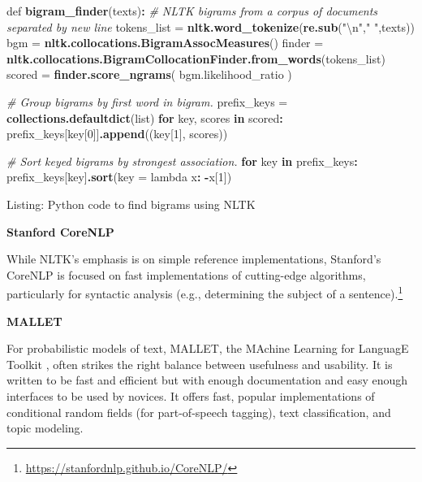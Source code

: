 \documentclass[]{krantz}
\newenvironment{Shaded}{\begin{snugshade}}{\end{snugshade}}
\newcommand{\KeywordTok}[1]{\textcolor[rgb]{0.13,0.29,0.53}{\textbf{#1}}}
\newcommand{\DataTypeTok}[1]{\textcolor[rgb]{0.13,0.29,0.53}{#1}}
\newcommand{\DecValTok}[1]{\textcolor[rgb]{0.00,0.00,0.81}{#1}}
\newcommand{\CharTok}[1]{\textcolor[rgb]{0.31,0.60,0.02}{#1}}
\newcommand{\StringTok}[1]{\textcolor[rgb]{0.31,0.60,0.02}{#1}}
\newcommand{\CommentTok}[1]{\textcolor[rgb]{0.56,0.35,0.01}{\textit{#1}}}
\newcommand{\ControlFlowTok}[1]{\textcolor[rgb]{0.13,0.29,0.53}{\textbf{#1}}}
\newcommand{\OperatorTok}[1]{\textcolor[rgb]{0.81,0.36,0.00}{\textbf{#1}}}
\newcommand{\NormalTok}[1]{#1}
\begin{document}
\begin{Shaded}
\begin{Highlighting}[]
\NormalTok{def }\KeywordTok{bigram_finder}\NormalTok{(texts)}\OperatorTok{:}
\StringTok{  }\CommentTok{# NLTK bigrams from a corpus of documents separated by new line}
\StringTok{  }\NormalTok{tokens_list =}\StringTok{ }\KeywordTok{nltk.word_tokenize}\NormalTok{(}\KeywordTok{re.sub}\NormalTok{(}\StringTok{"}\CharTok{\textbackslash{}n}\StringTok{"}\NormalTok{,}\StringTok{" "}\NormalTok{,texts))}
\NormalTok{  bgm    =}\StringTok{ }\KeywordTok{nltk.collocations.BigramAssocMeasures}\NormalTok{()}
\NormalTok{  finder =}\StringTok{ }\KeywordTok{nltk.collocations.BigramCollocationFinder.from_words}\NormalTok{(tokens_list)}
\NormalTok{  scored =}\StringTok{ }\KeywordTok{finder.score_ngrams}\NormalTok{( bgm.likelihood_ratio  )}

  \CommentTok{# Group bigrams by first word in bigram.}
\NormalTok{  prefix_keys =}\StringTok{ }\KeywordTok{collections.defaultdict}\NormalTok{(list)}
  \ControlFlowTok{for}\NormalTok{ key, scores }\ControlFlowTok{in}\NormalTok{ scored}\OperatorTok{:}
\StringTok{      }\NormalTok{prefix_keys[key[}\DecValTok{0}\NormalTok{]]}\KeywordTok{.append}\NormalTok{((key[}\DecValTok{1}\NormalTok{], scores))}

  \CommentTok{# Sort keyed bigrams by strongest association.}
  \ControlFlowTok{for}\NormalTok{ key }\ControlFlowTok{in}\NormalTok{ prefix_keys}\OperatorTok{:}
\StringTok{      }\NormalTok{prefix_keys[key]}\KeywordTok{.sort}\NormalTok{(}\DataTypeTok{key =}\NormalTok{ lambda x}\OperatorTok{:}\StringTok{ }\OperatorTok{-}\NormalTok{x[}\DecValTok{1}\NormalTok{])}
\end{Highlighting}
\end{Shaded}

Listing: Python code to find bigrams using NLTK

\textbf{Stanford CoreNLP}

While NLTK's emphasis is on simple reference implementations, Stanford's
CoreNLP \citep{manning2014stanford} is focused on fast implementations
of cutting-edge algorithms, particularly for syntactic analysis (e.g.,
determining the subject of a sentence).\footnote{\url{https://stanfordnlp.github.io/CoreNLP/}}

\textbf{MALLET}

For probabilistic models of text, MALLET, the MAchine Learning for
LanguagE Toolkit \citep{mallet}, often strikes the right balance between
usefulness and usability. It is written to be fast and efficient but
with enough documentation and easy enough interfaces to be used by
novices. It offers fast, popular implementations of conditional random
fields (for part-of-speech tagging), text classification, and topic
modeling.
\end{document}
